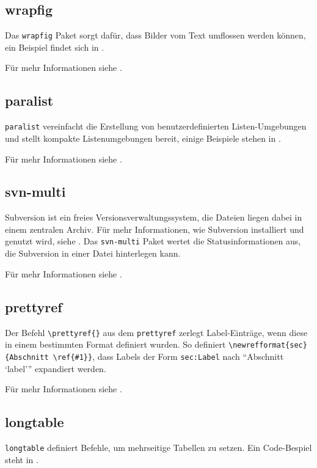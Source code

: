 \subsection{wrapfig}

Das \texttt{wrapfig} Paket sorgt dafür, dass Bilder vom Text umflossen werden können, ein Beispiel findet sich in .

Für mehr Informationen siehe \cite{wrapfig}.


\subsection{paralist}

\texttt{paralist} vereinfacht die Erstellung von benutzerdefinierten Listen-Umgebungen und stellt kompakte Listenumgebungen bereit, einige Beispiele stehen in .

Für mehr Informationen siehe \cite{paralist}.

\subsection{svn-multi}

Subversion ist ein freies Versionsverwaltungssystem, die Dateien liegen dabei in einem zentralen Archiv. Für mehr Informationen, wie Subversion installiert und genutzt wird, siehe \cite{ziegenhagen:svn}. Das \texttt{svn-multi} Paket wertet die Statusinformationen aus, die Subversion in einer Datei hinterlegen kann. 

Für mehr Informationen siehe \cite{svnmulti}.


\subsection{prettyref}

Der Befehl \verb|\prettyref{}| aus dem \texttt{prettyref} zerlegt Label-Einträge, wenn diese in einem bestimmten Format definiert wurden. So definiert \verb|\newrefformat{sec}{Abschnitt \ref{#1}}|, dass Labels der Form \verb|sec:Label| nach \enquote{Abschnitt \enquote{label}} expandiert werden. 

Für mehr Informationen siehe \cite{prettyref}.

\subsection{longtable}

\texttt{longtable} definiert Befehle, um mehrseitige Tabellen zu setzen. Ein Code-Bespiel steht in .

